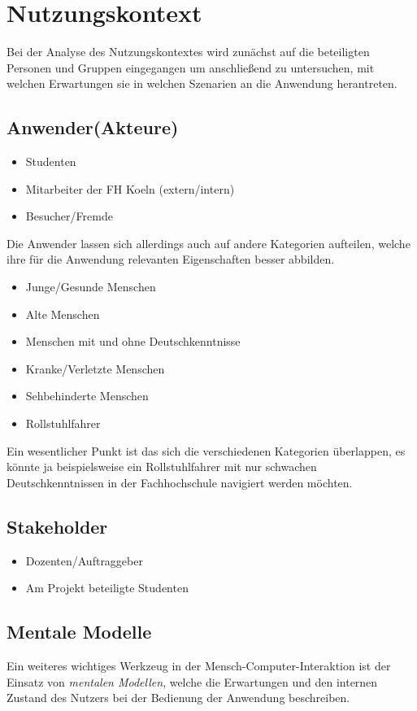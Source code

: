 \chapter{Nutzungskontext}
Bei der Analyse des Nutzungskontextes wird zunächst auf die beteiligten Personen
und Gruppen eingegangen um anschließend zu untersuchen, mit welchen Erwartungen
sie in welchen Szenarien an die Anwendung herantreten.

\section{Anwender(Akteure)}
\begin{itemize}
  \item Studenten
  \item Mitarbeiter der FH Koeln (extern/intern)
  \item Besucher/Fremde
\end{itemize}

\noindent
Die Anwender lassen sich allerdings auch auf andere Kategorien aufteilen, welche
ihre für die Anwendung relevanten Eigenschaften besser abbilden.
\begin{itemize}
  \item Junge/Gesunde Menschen
  \item Alte Menschen
  \item Menschen mit und ohne Deutschkenntnisse
  \item Kranke/Verletzte Menschen
  \item Sehbehinderte Menschen
  \item Rollstuhlfahrer
\end{itemize}

\noindent
Ein wesentlicher Punkt ist das sich die verschiedenen Kategorien überlappen, es
könnte ja beispielsweise ein Rollstuhlfahrer mit nur schwachen
Deutschkenntnissen in der Fachhochschule navigiert werden möchten.

\section{Stakeholder}
\begin{itemize}
  \item Dozenten/Auftraggeber
  \item Am Projekt beteiligte Studenten
\end{itemize}

\section{Mentale Modelle}
Ein weiteres wichtiges Werkzeug in der Mensch-\-Computer-\-Interaktion ist der
Einsatz von \emph{mentalen Modellen}, welche die Erwartungen und den internen
Zustand des Nutzers bei der Bedienung der Anwendung beschreiben. \medskip

